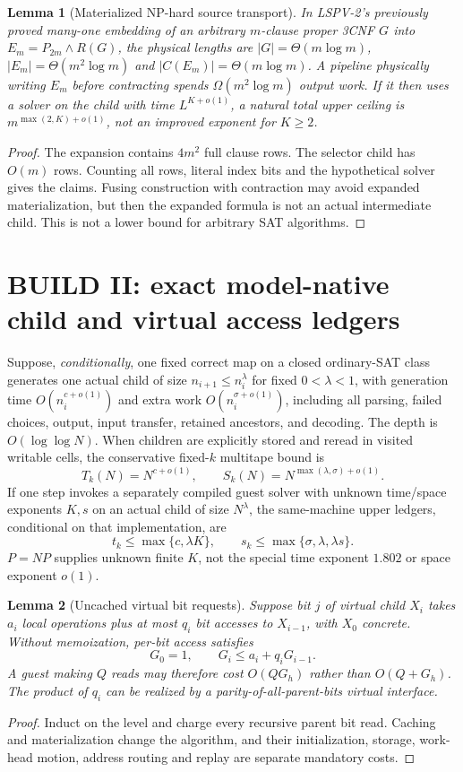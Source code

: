 \documentclass[11pt]{article}
\newtheorem{lemma}{Lemma}
\begin{document}
\begin{lemma}[Materialized NP-hard source transport]
In LSPV-2's previously proved many-one embedding of an arbitrary $m$-clause proper 3CNF $G$ into $E_m=P_{2m}\land R(G)$, the physical lengths are $|G|=\Theta(m\log m)$, $|E_m|=\Theta(m^2\log m)$ and $|C(E_m)|=\Theta(m\log m)$. A pipeline physically writing $E_m$ before contracting spends $\Omega(m^2\log m)$ output work. If it then uses a solver on the child with time $L^{K+o(1)}$, a natural total upper ceiling is $m^{\max(2,K)+o(1)}$, not an improved exponent for $K\ge2$.
\end{lemma}
\begin{proof}
The expansion contains $4m^2$ full clause rows. The selector child has $O(m)$ rows. Counting all rows, literal index bits and the hypothetical solver gives the claims. Fusing construction with contraction may avoid expanded materialization, but then the expanded formula is not an actual intermediate child. This is not a lower bound for arbitrary SAT algorithms.
\end{proof}

\section{BUILD II: exact model-native child and virtual access ledgers}
Suppose, \emph{conditionally}, one fixed correct map on a closed ordinary-SAT class generates one actual child of size $n_{i+1}\le n_i^\lambda$ for fixed $0<\lambda<1$, with generation time $O(n_i^{c+o(1)})$ and extra work $O(n_i^{\sigma+o(1)})$, including all parsing, failed choices, output, input transfer, retained ancestors, and decoding. The depth is $O(\log\log N)$. When children are explicitly stored and reread in visited writable cells, the conservative fixed-$k$ multitape bound is
\[
T_k(N)=N^{c+o(1)},\qquad
S_k(N)=N^{\max(\lambda,\sigma)+o(1)}.
\]
If one step invokes a separately compiled guest solver with unknown time/space exponents $K,s$ on an actual child of size $N^\lambda$, the same-machine upper ledgers, conditional on that implementation, are
\[
 t_k\le\max\{c,\lambda K\},\qquad
 s_k\le\max\{\sigma,\lambda,\lambda s\}.
\]
$P=NP$ supplies unknown finite $K$, not the special time exponent $1.802$ or space exponent $o(1)$.

\begin{lemma}[Uncached virtual bit requests]
Suppose bit $j$ of virtual child $X_i$ takes $a_i$ local operations plus at most $q_i$ bit accesses to $X_{i-1}$, with $X_0$ concrete. Without memoization, per-bit access satisfies
\[
 G_0=1,\qquad G_i\le a_i+q_i G_{i-1}.
\]
A guest making $Q$ reads may therefore cost $O(QG_h)$ rather than $O(Q+G_h)$. The product of $q_i$ can be realized by a parity-of-all-parent-bits virtual interface.
\end{lemma}
\begin{proof}
Induct on the level and charge every recursive parent bit read. Caching and materialization change the algorithm, and their initialization, storage, work-head motion, address routing and replay are separate mandatory costs.
\end{proof}
\end{document}
